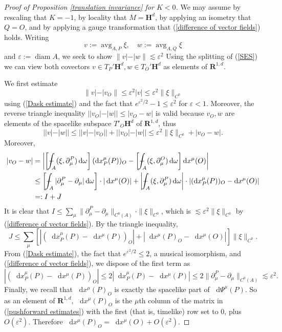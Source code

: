 \documentclass[final,12pt, leqno]{brownthesis}
\newcommand{\RR}{\mathbf{R}}
\newcommand{\Hyp}{\mathbf H}
\DeclareMathOperator{\avg}{avg}
\DeclareMathOperator{\diam}{diam}
\newcommand*\dif{\mathop{}\!\mathrm{d}}
\theoremstyle{definition}
\numberwithin{equation}{section}
\def\Xint#1{\mathchoice
{\XXint\displaystyle\textstyle{#1}}%
{\XXint\textstyle\scriptstyle{#1}}%
{\XXint\scriptstyle\scriptscriptstyle{#1}}%
{\XXint\scriptscriptstyle\scriptscriptstyle{#1}}%
\!\int}
\def\XXint#1#2#3{{\setbox0=\hbox{$#1{#2#3}{\int}$ }
\vcenter{\hbox{$#2#3$ }}\kern-.6\wd0}}
\def\dashint{\Xint-}
\begin{document}
\begin{proof}[Proof of Proposition \ref{translation invariance} for $K < 0$]
We may assume by rescaling that $K = -1$, by locality that $M = \Hyp^d$, by applying an isometry that $Q = O$, and by applying a gauge transformation that (\ref{difference of vector fields}) holds.
Writing
$$v := \avg_{A, P} \xi, \quad w := \avg_{A, Q} \xi$$
and $\varepsilon := \diam A$, we seek to show $\|v| - |w\| \lesssim \varepsilon^2$
Using the splitting of (\ref{SES}) we can view both covectors $v \in T_P' \Hyp^d, w \in T_O' \Hyp^d$ as elements of $\RR^{1, d}$.

We first estimate
$$\|v| - |v_O\| \leq \varepsilon^2 |v| \leq \varepsilon^2 \|\xi\|_{C^0}$$
using (\ref{Dask estimate}) and the fact that $e^{\varepsilon^2/2} - 1 \leq \varepsilon^2$ for $\varepsilon < 1$.
Moreover, the reverse triangle inequality $||v_O| - |w|| \leq |v_O - w|$ is valid because $v_O, w$ are elements of the spacelike subspace $T'_O \Hyp^d$ of $\RR^{1, d}$, thus
$$||v| - |w|| \leq ||v| - |v_O|| + ||v_O| - |w|| \leq \varepsilon^2 \|\xi\|_{C^0} + |v_O - w|.$$
Moreover,
\begin{align*}
|v_O - w| &= \left|\left[\dashint_A (\xi, \partial^P_\mu) \dif \omega\right] (\dif x_P^\mu(P))_O - \left[\dashint_A (\xi, \partial^O_\mu) \dif \omega\right] \dif x^\mu(O)\right| \\
&\leq \left[\dashint_A |\partial^P_\mu - \partial_\mu| \dif \omega\right] \cdot |\dif x^\mu(O)| + \left|\dashint_A (\xi, \partial_\mu^P) \dif \omega\right| \cdot |(\dif x^\mu_P(P))_O - \dif x^\mu(O)|\\
&=: I + J
\end{align*}
It is clear that $I \leq \sum_\mu \|\partial^P_\mu - \partial_\mu\|_{C^0(A)} \cdot \|\xi\|_{C^0}$, which is $\lesssim \varepsilon^2 \|\xi\|_{C^0}$ by (\ref{difference of vector fields}).
By the triangle inequality,
$$J \leq \sum_\mu \left[|(\dif x^\mu_P(P) - \dif x^\mu(P))_O| + |\dif x^\mu(P)_O - \dif x^\mu(O)|\right] \|\xi\|_{C^0}.$$
From (\ref{Dask estimate}), the fact that $e^{\varepsilon^2/2} \leq 2$, a musical isomorphism, and (\ref{difference of vector fields}), we dispose of the first term as
$$|(\dif x^\mu_P(P) - \dif x^\mu(P))_O| \leq 2 |\dif x^\mu_P(P) - \dif x^\mu(P)| \leq 2 \|\partial^P_\mu - \partial_\mu\|_{C^0(A)} \lesssim \varepsilon^2.$$
Finally, we recall that $\dif x^\mu(P)_O$ is exactly the spacelike part of $\dif \Psi^\mu(P)$.
So as an element of $\RR^{1, d}$, $\dif x^\mu(P)_O$ is the $\mu$th column of the matrix in (\ref{pushforward estimates}) with the first (that is, timelike) row set to $0$, plus $O(\varepsilon^2)$.
Therefore $\dif x^\mu(P)_O = \dif x^\mu(O) + O(\varepsilon^2)$.
\end{proof}
\end{document}
